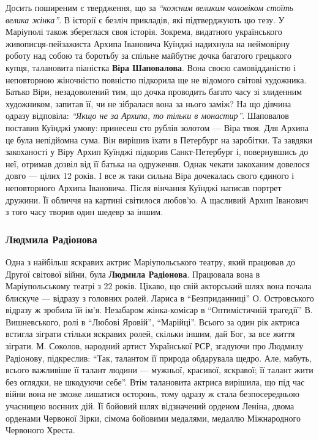Досить поширеним є твердження, що за \emph{\enquote{кожним великим чоловіком стоїть велика
жінка}}. В історії є безліч прикладів, які підтверджують цю тезу. У Маріуполі
також збереглася своя історія. Зокрема, видатного українського
живописця-пейзажиста Архипа Івановича Куїнджі надихнула на неймовірну роботу
над собою та боротьбу за спільне майбутнє дочка багатого грецького купця,
талановита піаністка \textbf{Віра Шаповалова}. Вона своєю самовідданістю і неповторною
жіночністю повністю підкорила ще не відомого світові художника. Батько Віри,
незадоволений тим, що дочка проводить багато часу зі злиденним художником,
запитав її, чи не зібралася вона за нього заміж? На що дівчина одразу
відповіла: \emph{\enquote{Якщо не за Архипа, то тільки в монастир}}. Шаповалов поставив
Куїнджі умову: принесеш сто рублів золотом — Віра твоя. Для Архипа це була
непідйомна сума. Він вирішив їхати в Петербург на заробітки. Та завдяки
закоханості у Віру Архип Куїнджі підкорив Санкт-Петербург і, повернувшись до
неї, отримав дозвіл від її батька на одруження. Однак чекати закоханим довелося
довго — цілих 12 років. І все ж таки сильна Віра дочекалась свого єдиного і
неповторного Архипа Івановича. Після вінчання Куїнджі написав портрет дружини.
Її обличчя на картині світилося любов'ю. А щасливий Архип Іванович з того часу
творив один шедевр за іншим.


\subsubsection{Людмила Радіонова}

Одна з найбільш яскравих актрис Маріупольського театру, який працював до Другої
світової війни, була \textbf{Людмила Радіонова}. Працювала вона в Маріупольському театрі
з 22 років. Цікаво, що свій акторський шлях вона почала блискуче — відразу з
головних ролей. Лариса в \enquote{Безприданниці} О. Островського відразу ж зробила їй
ім'я. Незабаром жінка-комісар в \enquote{Оптимістичній трагедії} В. Вишневського, ролі
в \enquote{Любові Яровій}, \enquote{Марійці}. Всього за один рік актриса встигла зіграти
стільки яскравих ролей, скільки іншим, дай Бог, за все життя зіграти. М.
Соколов, народний артист Української РСР, згадуючи про Людмилу Радіонову,
підкреслив: \enquote{Так, талантом її природа обдарувала щедро. Але, мабуть, всього
важливіше її талант людини — мужньої, красивої, яскравої; її талант жити без
оглядки, не шкодуючи себе}. Втім талановита актриса вирішила, що під час війни
вона не зможе лишатися осторонь, тому одразу ж стала безпосередньою учасницею
воєнних дій. Її бойовий шлях відзначений орденом Леніна, двома орденами
Червоної Зірки, сімома бойовими медалями, медаллю Міжнародного Червоного
Хреста.

